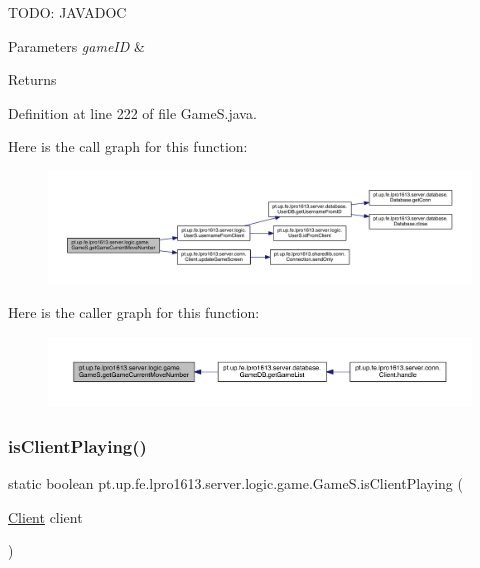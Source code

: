 T\+O\+DO\+: J\+A\+V\+A\+D\+OC 
\begin{DoxyParams}{Parameters}
{\em game\+ID} & \\
\hline
\end{DoxyParams}
\begin{DoxyReturn}{Returns}

\end{DoxyReturn}


Definition at line 222 of file Game\+S.\+java.

Here is the call graph for this function\+:
\nopagebreak
\begin{figure}[H]
\begin{center}
\leavevmode
\includegraphics[width=350pt]{classpt_1_1up_1_1fe_1_1lpro1613_1_1server_1_1logic_1_1game_1_1_game_s_af9eabf8847fec79f112b49212847a478_cgraph}
\end{center}
\end{figure}
Here is the caller graph for this function\+:
\nopagebreak
\begin{figure}[H]
\begin{center}
\leavevmode
\includegraphics[width=350pt]{classpt_1_1up_1_1fe_1_1lpro1613_1_1server_1_1logic_1_1game_1_1_game_s_af9eabf8847fec79f112b49212847a478_icgraph}
\end{center}
\end{figure}
\hypertarget{classpt_1_1up_1_1fe_1_1lpro1613_1_1server_1_1logic_1_1game_1_1_game_s_a9da22a4fd6609b821502380c3ececb41}{}\label{classpt_1_1up_1_1fe_1_1lpro1613_1_1server_1_1logic_1_1game_1_1_game_s_a9da22a4fd6609b821502380c3ececb41} 
\subsubsection{\texorpdfstring{is\+Client\+Playing()}{isClientPlaying()}}
{\footnotesize\ttfamily static boolean pt.\+up.\+fe.\+lpro1613.\+server.\+logic.\+game.\+Game\+S.\+is\+Client\+Playing (\begin{DoxyParamCaption}\item[{\hyperlink{classpt_1_1up_1_1fe_1_1lpro1613_1_1server_1_1conn_1_1_client}{Client}}]{client }\end{DoxyParamCaption})\hspace{0.3cm}{\ttfamily [static]}}

